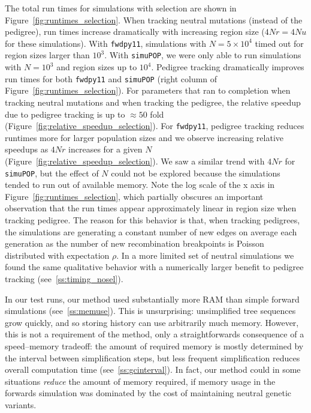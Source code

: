 \documentclass{article}
\newcommand{\simupop}{\texttt{simuPOP}}
\newcommand{\fwdpy}{\texttt{fwdpy11}}
\newcommand{\krt}[1]{{\em \color{green} #1}}
\begin{document}


The total run times for simulations with selection are shown in Figure~\ref{fig:runtimes_selection}.  When tracking
neutral mutations (instead of the pedigree), run times increase dramatically with increasing region size ($4Nr = 4Nu$ for
these simulations).  With \fwdpy{}, simulations with $N=5 \times 10^4$ timed out for region sizes larger than $10^3$.
With \simupop{}, we were only able to run simulations with $N=10^3$ and region sizes up to $10^4$.  Pedigree tracking
dramatically improves run times for both \fwdpy{} and \simupop{} (right column of Figure~\ref{fig:runtimes_selection}).  For parameters that ran to completion when tracking neutral mutations and when tracking
the pedigree, the relative speedup due to pedigree tracking is up to $\approx 50$ fold
(Figure~\ref{fig:relative_speedup_selection}).  For \fwdpy{}, pedigree tracking reduces runtimes more for larger
population sizes and we observe increasing relative speedups as $4Nr$ increases for a given $N$
(Figure~\ref{fig:relative_speedup_selection}).  We saw a similar trend with $4Nr$ for \simupop{}, but the effect of $N$
could not be explored because the simulations tended to run out of available memory.
Note the log scale of the x axis in Figure~\ref{fig:runtimes_selection}, which
partially obscures an important observation that the run times appear approximately linear in region size when tracking
pedigree.  The reason for this behavior is that, when tracking pedigrees, the simulations are generating a constant number of new edges on average
each generation as the number of new recombination breakpoints is Poisson distributed with expectation $\rho$.
In a more limited set of neutral simulations we found the same qualitative
behavior with a numerically larger benefit to pedigree tracking (see~\ref{ss:timing_nosel}).

In our test runs, our method used substantially more RAM than simple forward simulations (see~\ref{ss:memuse}).
This is unsurprising:
unsimplified tree sequences grow quickly, and so storing history can use arbitrarily much memory.
However, this is not a requirement of the method, only a straightforwards consequence of a speed--memory tradeoff:
the amount of required memory is mostly determined by the interval between simplification steps,
but less frequent simplification reduces overall computation time (see~\ref{ss:gcinterval}).
In fact, our method could in some situations \emph{reduce} the amount of memory required,
if memory usage in the forwards simulation was dominated by the cost of maintaining neutral genetic variants.
\end{document}
